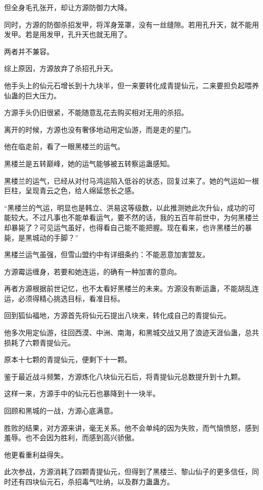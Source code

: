 \begin{this_body}
但全身毛孔张开，却让方源防御力大降。

同时，方源的防御杀招发甲，将浑身笼罩，没有一丝缝隙。若用孔升天，就不能用发甲。若是用发甲，孔升天也就无用了。

两者并不兼容。

综上原因，方源放弃了杀招孔升天。

他手头上的仙元石增长到十九块半，但一来要转化成青提仙元，二来要担负起喂养仙蛊的巨大压力。

方源手头仍旧很紧，不能随意乱花去购买相对无用的杀招。

离开的时候，方源也没有奢侈地动用定仙游，而是走的星门。

他在临走前，看了一眼黑楼兰的运气。

黑楼兰是五转巅峰，她的运气能够被五转察运蛊感知。

黑楼兰的运气，已经从对付马鸿运陷入低谷的状态，回复过来了。她的气运如一根巨柱，呈现青云之色，给人绵延悠长之感。

“黑楼兰的气运，明显也是韩立、洪易这等级数，以此推测她此次升仙，成功的可能较大。不过凡事也不能单看运气，要不然的话，我的五百年前世中，为何黑楼兰却暴毙了？可见运气虽好，也得看自己能不能把握。现在看来，也许黑楼兰的暴毙，是黑城动的手脚？”

黑楼兰运气虽强，但雪山盟约中有详细条约：不能恶意加害盟友。

方源霉运缠身，若要和她连运，的确有一种加害的意向。

再者方源根据前世记忆，也不太看好黑楼兰的未来。方源没有断运蛊，不能胡乱连运，必须得精心挑选目标，看准目标。

回到狐仙福地，方源首先将仙元石提出八块来，转化成自己的青提仙元。

他多次用定仙游，往回西漠、中洲、南海，和黑城交战又用了浪迹天涯仙蛊，总共损耗了六颗青提仙元。

原本十七颗的青提仙元，便剩下十一颗。

鉴于最近战斗频繁，方源炼化八块仙元石后，将青提仙元总数提升到十九颗。

这样一来，方源手中的仙元石也暴降到十一块半。

回顾和黑城的一战，方源心底满意。

胜败的结果，对方源来讲，毫无关系。他不会单纯的因为失败，而气恼愤怒，感到羞辱。也不会因为胜利，而感到高兴骄傲。

他更看重利益得失。

此次参战，方源消耗了四颗青提仙元，但得到了黑楼兰、黎山仙子的更多信任，同时还有四块仙元石，杀招毒气吐纳，以及群力蛊蛊方。


\end{this_body}

